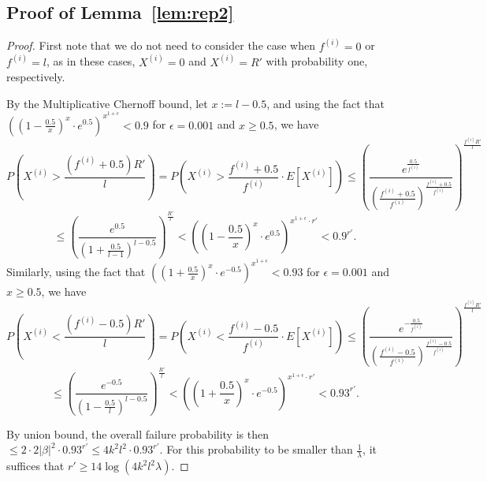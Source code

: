 \documentclass{article}
\begin{document}
\subsection{Proof of Lemma~\ref{lem:rep2}}
\begin{proof}
    First note that we do not need to consider the case when $f^{(i)}=0$ or $f^{(i)}=l$, as in these cases, $X^{(i)}=0$ and $X^{(i)}=R'$ with probability one, respectively. 
    
    By the Multiplicative Chernoff bound, let $x:=l-0.5$, and using the fact that $((1-\frac{0.5}{x})^x\cdot e^{0.5})^{x^{1+\epsilon}}<0.9$ for $\epsilon=0.001$ and $x\geq0.5$, we have
    \[P\left(X^{(i)}>\frac{(f^{(i)}+0.5)R'}{l}\right)=P\left(X^{(i)}>\frac{f^{(i)}+0.5}{f^{(i)}}\cdot E[X^{(i)}]\right)\leq\left(\frac{e^{\frac{0.5}{f^{(i)}}}}{(\frac{f^{(i)}+0.5}{f^{(i)}})^{\frac{f^{(i)}+0.5}{f^{(i)}}}}\right)^{\frac{f^{(i)}R'}{l}}\]
    \[\leq \left(\frac{e^{0.5}}{(1+\frac{0.5}{l-1})^{l-0.5}}\right)^\frac{R'}{l}<\left(\left(1-\frac{0.5}{x}\right)^x\cdot e^{0.5}\right)^{x^{1+\epsilon}\cdot r'}<0.9^{r'}.\]
    Similarly, using the fact that $((1+\frac{0.5}{x})^x\cdot e^{-0.5})^{x^{1+\epsilon}}<0.93$ for $\epsilon=0.001$ and $x\geq0.5$, we have
    \[
    P\left(X^{(i)}<\frac{(f^{(i)}-0.5)R'}{l}\right)=P\left(X^{(i)}<\frac{f^{(i)}-0.5}{f^{(i)}}\cdot E[X^{(i)}]\right)\leq\left(\frac{e^{-\frac{0.5}{f^{(i)}}}}{(\frac{f^{(i)}-0.5}{f^{(i)}})^{\frac{f^{(i)}-0.5}{f^{(i)}}}}\right)^{\frac{f^{(i)}R'}{l}}\]
    \[\leq \left(\frac{e^{-0.5}}{(1-\frac{0.5}{l})^{l-0.5}}\right)^\frac{R'}{l}<\left(\left(1+\frac{0.5}{x}\right)^{x}\cdot e^{-0.5}\right)^{x^{1+\epsilon}\cdot r'}<0.93^{r'}.
    \]
    
    By union bound, the overall failure probability is then $\leq 2\cdot 2|\beta|^2\cdot 0.93^{r'}\leq 4k^2l^2\cdot 0.93^{r'}$. For this probability to be smaller than $\frac{1}{\lambda}$, it suffices that $r'\geq 14\log(4k^2l^2\lambda)$. 
\end{proof}
\end{document}
